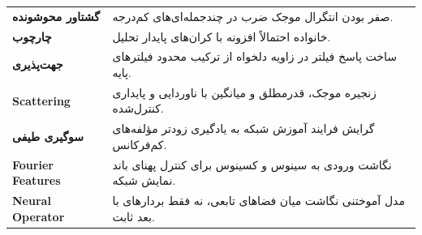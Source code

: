 \begin{longtable}{>{\bfseries}p{}p{}}
گشتاور محوشونده & صفر بودن انتگرال موجک ضرب در چندجمله‌ای‌های کم‌درجه.\\
چارچوب & خانواده احتمالاً افزونه با کران‌های پایدار تحلیل.\\
جهت‌پذیری & ساخت پاسخ فیلتر در زاویه دلخواه از ترکیب محدود فیلترهای پایه.\\
Scattering & زنجیره موجک، قدرمطلق و میانگین با ناوردایی و پایداری کنترل‌شده.\\
سوگیری طیفی & گرایش فرایند آموزش شبکه به یادگیری زودتر مؤلفه‌های کم‌فرکانس.\\
Fourier Features & نگاشت ورودی به سینوس و کسینوس برای کنترل پهنای باند نمایش شبکه.\\
Neural Operator & مدل آموختنی نگاشت میان فضاهای تابعی، نه فقط بردارهای با بعد ثابت.\\
\bottomrule
\end{longtable}
